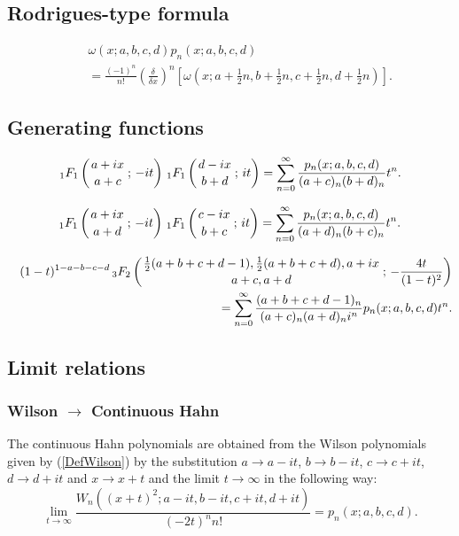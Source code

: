 \documentclass[envcountchap,graybox]{svmono}
\newcounter{rom}
\newcommand{\hyp}[5]{\mbox{}_{#1}{F}_{#2}
\left(\genfrac{}{}{0pt}{}{#3}{#4}\,;\,#5\right)}
\newcommand{\hyp}[5]{\,\mbox{}_{#1}F_{#2}\!\left(
  \genfrac{}{}{0pt}{}{#3}{#4};#5\right)}
\begin{document}
\subsection*{Rodrigues-type formula}
\begin{eqnarray}
\label{RodContHahn}
& &\omega(x;a,b,c,d)p_n(x;a,b,c,d)\nonumber\\
& &{}=\frac{(-1)^n}{n!}\left(\frac{\delta}{\delta x}\right)^n
\left[\omega(x;a+\textstyle\frac{1}{2}n,b+\textstyle\frac{1}{2}n,
c+\textstyle\frac{1}{2}n,d+\textstyle\frac{1}{2}n)\right].
\end{eqnarray}

\subsection*{Generating functions}
\begin{equation}
\label{GenContHahn1}
\hyp{1}{1}{a+ix}{a+c}{-it}\,\hyp{1}{1}{d-ix}{b+d}{it}=
\sum_{n=0}^{\infty}\frac{p_n(x;a,b,c,d)}{(a+c)_n(b+d)_n}t^n.
\end{equation}

\begin{equation}
\label{GenContHahn2}
\hyp{1}{1}{a+ix}{a+d}{-it}\,\hyp{1}{1}{c-ix}{b+c}{it}=
\sum_{n=0}^{\infty}\frac{p_n(x;a,b,c,d)}{(a+d)_n(b+c)_n}t^n.
\end{equation}

\begin{eqnarray}
\label{GenContHahn3}
& &(1-t)^{1-a-b-c-d}\,\hyp{3}{2}{\frac{1}{2}(a+b+c+d-1),\frac{1}{2}(a+b+c+d),a+ix}
{a+c,a+d}{-\frac{4t}{(1-t)^2}}\nonumber\\
& &{}=\sum_{n=0}^{\infty}
\frac{(a+b+c+d-1)_n}{(a+c)_n(a+d)_ni^n}p_n(x;a,b,c,d)t^n.
\end{eqnarray}

\subsection*{Limit relations}

\subsubsection*{Wilson $\rightarrow$ Continuous Hahn}
The continuous Hahn polynomials are obtained from the Wilson polynomials given by
(\ref{DefWilson}) by the substitution $a\rightarrow a-it$, $b\rightarrow b-it$,
$c\rightarrow c+it$, $d\rightarrow d+it$ and $x\rightarrow x+t$ and the limit
$t\rightarrow\infty$ in the following way:
$$\lim_{t\rightarrow\infty}
\frac{W_n((x+t)^2;a-it,b-it,c+it,d+it)}{(-2t)^nn!}=p_n(x;a,b,c,d).$$
\end{document}

